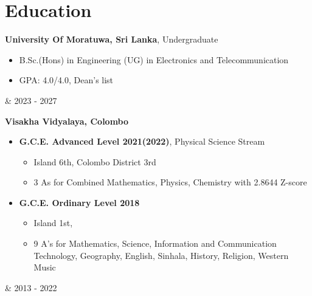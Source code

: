 \documentclass[10pt, a4paper]{article}
\newenvironment{highlights}{
        \begin{itemize}[
                topsep=0pt,
                parsep=0.10 cm,
                partopsep=0pt,
                itemsep=0pt,
                after=\vspace{-1\baselineskip},
                leftmargin=0.4 cm + 3pt
            ]
    }{
        \end{itemize}
    } %
\let\hrefWithoutArrow\href
\renewcommand{\href}[2]{\hrefWithoutArrow{#1}{\mbox{\ifthenelse{\equal{#2}{}}{ }{#2 }\raisebox{.15ex}{\footnotesize \faExternalLink*}}}}
\let\originalTabularx\tabularx
\let\originalEndTabularx\endtabularx
\renewenvironment{tabularx}{\bgroup\centering\originalTabularx}{\originalEndTabularx\par\egroup}
\begin{document}
    \section{Education}

	 \begin{tabularx}{
	            \textwidth-0.4 cm-0.13cm
	        }{
	            K{0.2 cm}
	            R{4.1 cm}
	        }
	            \textbf{University Of Moratuwa, Sri Lanka}, Undergraduate
	
	            \vspace{0.10 cm}
	
	            \begin{highlights}
	                \item B.Sc.(Hons) in Engineering (UG) in Electronics and Telecommunication
                \item GPA: 4.0/4.0, Dean's list %
	            \end{highlights}
            &
            2023 - 2027
        \end{tabularx}
        
        \vspace{0.2 cm}
        \begin{tabularx}{
	            \textwidth-0.4 cm-0.13cm
	        }{
	            K{0.2 cm}
	            R{4.1 cm}
	        }
	            \textbf{Visakha Vidyalaya, Colombo}
	
	            \vspace{0.10 cm}
	
	            \begin{highlights}
	                \item \textbf{G.C.E. Advanced Level 2021(2022)}, Physical Science Stream 
	            	\begin{highlights}
	            	\item Island 6th, Colombo District 3rd 
	            	\item 3 As for Combined Mathematics, Physics, Chemistry with 2.8644 Z-score
	                \end{highlights} \vspace{0.40 cm}
	                \item \textbf{G.C.E. Ordinary Level 2018}
	                \begin{highlights}
	                \item Island 1st, 
	                \item 9 A’s for Mathematics, Science, Information and Communication Technology, Geography, English, Sinhala, History, Religion, Western Music
	                \end{highlights}
	            \end{highlights}
            &
            2013 - 2022
        \end{tabularx}
\end{document}
